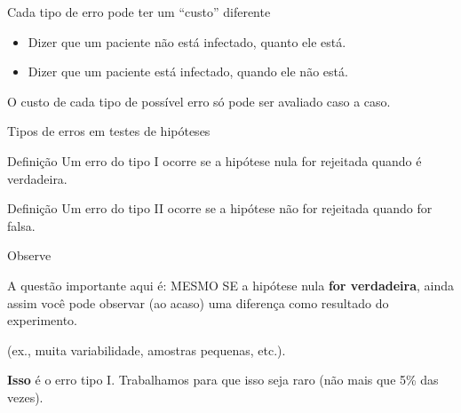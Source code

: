\documentclass{beamer}
\begin{document}
\begin{frame}{\scriptsize Cada tipo de erro pode ter um ``custo'' diferente}
  \begin{itemize}
    \footnotesize
  \item Dizer que um paciente não está infectado, quanto ele está.
    \medskip
  \item Dizer que um paciente está infectado, quando ele não está.
  \end{itemize}

  \bigskip
  \begin{block}{}
    \footnotesize
    O custo de cada tipo de possível erro só pode ser avaliado caso a caso.
  \end{block}
\end{frame}

\begin{frame}{\scriptsize Tipos de erros em testes de hipóteses}
  \begin{block}{Definição}
    \footnotesize
    Um \alert{erro do tipo I} ocorre se a hipótese nula for rejeitada
    quando é verdadeira.
  \end{block}
  \begin{block}{Definição}
    \footnotesize
    Um \alert{erro do tipo II} ocorre se a hipótese não for rejeitada
    quando for falsa.
  \end{block}
\end{frame}

\begin{frame}[label=observacao]{\scriptsize Observe}
  \begin{block}{A questão importante aqui é:}
    \footnotesize
    MESMO SE a hipótese nula {\bf for verdadeira}, ainda assim você pode observar (ao acaso) uma diferença como resultado do experimento.

    \bigskip
    (ex., muita variabilidade, amostras pequenas, etc.).

    \bigskip
    {\bf Isso} é o erro tipo I.
    \tiny
    Trabalhamos para que isso seja raro (não mais que 5\% das vezes).
  \end{block}
\end{frame}

\end{document}
